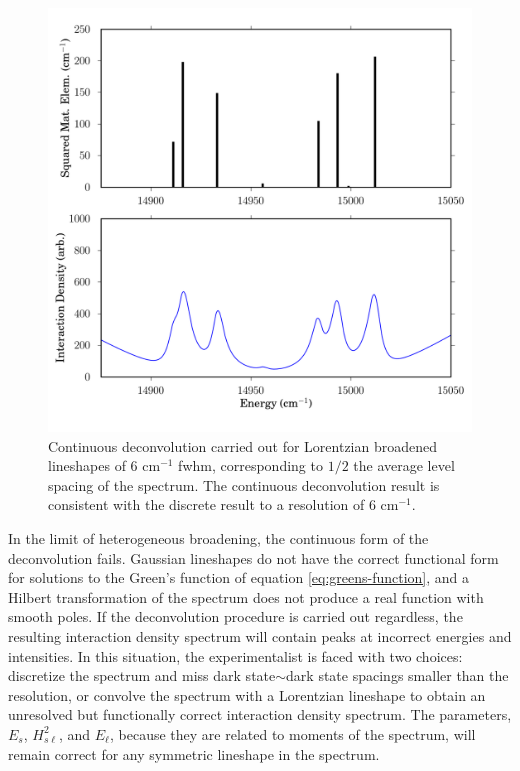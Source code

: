 \begin{figure}
  \caption{Continuous deconvolution carried out for Lorentzian
    broadened lineshapes of 6 cm$^{-1}$ fwhm, corresponding to $1/2$
    the average level spacing of the spectrum.  The continuous
    deconvolution result is consistent with the discrete result to a
    resolution of 6 cm$^{-1}$.  }
  \label{fig:broadened}
  \centering
  \includegraphics[width=6in]{smalley-compare-fwhm6.png}
\end{figure}

In the limit of heterogeneous broadening, the continuous form of the
deconvolution fails.  Gaussian lineshapes do not have the correct
functional form for solutions to the Green's function of equation
\ref{eq:greens-function}, and a Hilbert transformation of the spectrum
does not produce a real function with smooth poles.  If the
deconvolution procedure is carried out regardless, the resulting
interaction density spectrum will contain peaks at incorrect energies
and intensities.  In this situation, the experimentalist is faced with
two choices: discretize the spectrum and miss dark state$\sim$dark
state spacings smaller than the resolution, or convolve the spectrum
with a Lorentzian lineshape to obtain an unresolved but functionally
correct interaction density spectrum.  The parameters, $E_s$,
$H_{s\ell}^2$, and $E_{\ell}$, because they are related to moments of
the spectrum, will remain correct for any symmetric lineshape in the
spectrum.


